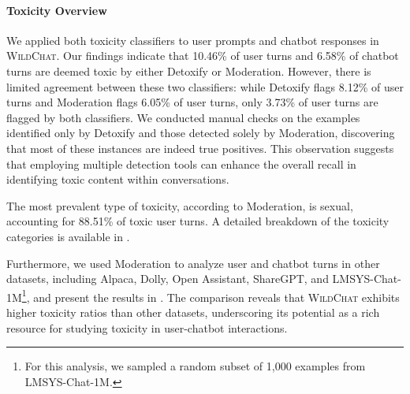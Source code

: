 \documentclass{article} %
\newcommand{\corpus}{\textsc{WildChat}\xspace}
\begin{document}
\paragraph{Toxicity Overview} We applied both toxicity classifiers to user prompts and chatbot responses in \corpus. Our findings indicate that 10.46\% of user turns and 6.58\% of chatbot turns are deemed toxic by either Detoxify or Moderation. However, there is limited agreement between these two classifiers: while Detoxify flags 8.12\% of user turns and Moderation flags 6.05\% of user turns, only 3.73\% of user turns are flagged by both classifiers. We conducted manual checks on the examples identified only by Detoxify and those detected solely by Moderation, discovering that most of these instances are indeed true positives. This observation suggests that employing multiple detection tools can enhance the overall recall in identifying toxic content within conversations.

The most prevalent type of toxicity, according to Moderation, is sexual, accounting for 88.51\% of toxic user turns. A detailed breakdown of the toxicity categories is available in .





Furthermore, we used Moderation to analyze user and chatbot turns in other datasets, including Alpaca, Dolly, Open Assistant, ShareGPT, and LMSYS-Chat-1M\footnote{For this analysis, we sampled a random subset of 1,000 examples from LMSYS-Chat-1M.}, and present the results in . The comparison reveals that \corpus exhibits higher toxicity ratios than other datasets, underscoring its potential as a rich resource for studying toxicity in user-chatbot interactions.
\end{document}
